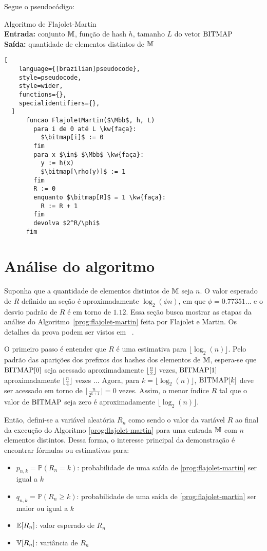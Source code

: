 Segue o pseudocódigo:
\begin{programruledcaption}{
Algoritmo de Flajolet-Martin 
\\ \textbf{Entrada:} conjunto $\mathbb{M}$, função de hash $h$, tamanho $L$ do vetor $\text{BITMAP}$ 
\\ \textbf{Saída:} quantidade de elementos distintos de $\mathbb{M}$
\label{prog:flajolet-martin}
}
  \begin{lstlisting}[
    language={[brazilian]pseudocode},
    style=pseudocode,
    style=wider,
    functions={},
    specialidentifiers={},
  ]
      funcao FlajoletMartin($\Mbb$, h, L)
        para i de 0 até L \kw{faça}:
          $\bitmap[i]$ := 0
        fim
        para x $\in$ $\Mbb$ \kw{faça}:
          y := h(x)
          $\bitmap[\rho(y)]$ := 1
        fim
        R := 0
        enquanto $\bitmap[R]$ = 1 \kw{faça}:
          R := R + 1
        fim
        devolva $2^R/\phi$
      fim
  \end{lstlisting}
\end{programruledcaption}

\section{Análise do algoritmo}
\label{sec:flajolet-martin:analysis}

Suponha que a quantidade de elementos distintos de $\mathbb{M}$ seja $n$. O valor esperado de $R$ definido na seção 
 é aproximadamente $\log_2(\phi n)$, em que $\phi = 0.77351\dots$ e o desvio padrão 
de $R$ é em torno de $1.12$. Essa seção busca mostrar as etapas da análise do Algoritmo~\ref{prog:flajolet-martin} feita 
por Flajolet e Martin. Os detalhes da prova podem ser vistos em ~\citep{flajolet:martin:85}.

O primeiro passo é entender que $R$ é uma estimativa para $\lfloor \log_2(n) \rfloor$. Pelo padrão das aparições dos 
prefixos dos hashes dos elementos de $\mathbb{M}$, espera-se que $\text{BITMAP}[0]$ seja acessado aproximadamente $\lfloor 
\frac{n}{2} \rfloor$ vezes, $\text{BITMAP}[1]$ aproximadamente $\lfloor \frac{n}{4} \rfloor$ vezes $\dots$ Agora, para 
$k = \lfloor \log_2(n) \rfloor$, $\text{BITMAP}[k]$ deve ser acessado em torno de $\lfloor \frac{n}{2^{k+1}} \rfloor = 0$ 
vezes. Assim, o menor índice $R$ tal que o valor de $\text{BITMAP}$ seja zero é aproximadamente $\lfloor \log_2(n) \rfloor$.

Então, defini-se a variável aleatória $R_n$ como sendo o valor da variável $R$ ao final da execução do Algoritmo 
\ref{prog:flajolet-martin} para uma entrada $\mathbb{M}$ com $n$ elementos distintos. Dessa forma, o interesse principal 
da demonstração é encontrar fórmulas ou estimativas para:
\begin{itemize}
  \item $p_{n,k} = \mathbb{P}(R_n = k)$: probabilidade de uma saída de \ref{prog:flajolet-martin} ser igual a $k$
  \item $q_{n,k} = \mathbb{P}(R_n \geq k)$: probabilidade de uma saída de \ref{prog:flajolet-martin} 
  ser maior ou igual a $k$
  \item $\mathbb{E}[R_n]$: valor esperado de $R_n$
  \item $\mathbb{V}[R_n]$: variância de $R_n$
\end{itemize}


